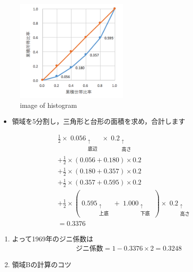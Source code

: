 \documentclass[
]{book}
\providecommand{\tightlist}{%
  \setlength{\itemsep}{0pt}\setlength{\parskip}{0pt}}
\theoremstyle{definition}
\theoremstyle{definition}
\theoremstyle{definition}
\theoremstyle{definition}
\theoremstyle{remark}
\begin{document}
\begin{figure}
\centering
\includegraphics[width=0.5\textwidth,height=\textheight]{images/lec03/fig_us_lorenz1966.png}
\caption{image of histogram}
\end{figure}

\begin{itemize}
\tightlist
\item
  領域を5分割し，三角形と台形の面積を求め，合計します
\end{itemize}

\begin{align*} 
&\tfrac{1}{2} \times \mathop{0.056}_{\substack{\uparrow \\ \text{底辺}}} \times \mathop{0.2}_{\substack{\uparrow \\ \text{高さ}}} \\
&+\tfrac{1}{2} \times (0.056+0.180) \times 0.2 \\
&+\tfrac{1}{2} \times (0.180+0.357) \times 0.2 \\
&+\tfrac{1}{2} \times (0.357+0.595) \times 0.2 \\
&+\tfrac{1}{2} \times (
\mathop{0.595}_{\substack{\uparrow \\ \text{上底}}}
+
\mathop{1.000}_{\substack{\uparrow \\ \text{下底}}}
) \times 
\mathop{0.2}_{\substack{\uparrow \\ \text{高さ}}} \\
&=0.3376
\end{align*}

\begin{enumerate}
\def\labelenumi{\arabic{enumi}.}
\setcounter{enumi}{3}
\item
  よって1969年のジニ係数は
  \begin{align*}
  \text{ジニ係数}=1-0.3376\times 2=0.3248
  \end{align*}
\item
  領域Bの計算のコツ
\end{enumerate}
\end{document}
